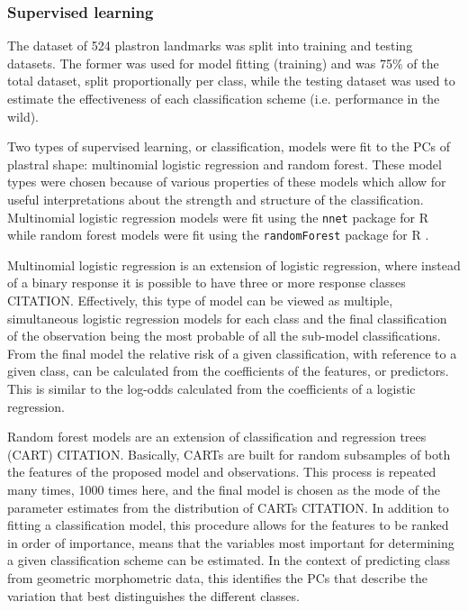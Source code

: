 \documentclass[12pt]{article}\usepackage{graphicx, color}
\begin{document}
\subsubsection{Supervised learning}
The dataset of 524 plastron landmarks was split into training and testing datasets. The former was used for model fitting (training) and was 75\% of the total dataset, split proportionally per class, while the testing dataset was used to estimate the effectiveness of each classification scheme (i.e. performance in the wild).

Two types of supervised learning, or classification, models were fit to the PCs of plastral shape: multinomial logistic regression and random forest. These model types were chosen because of various properties of these models which allow for useful interpretations about the strength and structure of the classification. Multinomial logistic regression models were fit using the \texttt{nnet} package for R \citep{Venables2002} while random forest models were fit using the \texttt{randomForest} package for R \citep{Liaw2002}.

Multinomial logistic regression is an extension of logistic regression, where instead of a binary response it is possible to have three or more response classes CITATION. Effectively, this type of model can be viewed as multiple, simultaneous logistic regression models for each class and the final classification of the observation being the most probable of all the sub-model classifications. From the final model the relative risk of a given classification, with reference to a given class, can be calculated from the coefficients of the features, or predictors. This is similar to the log-odds calculated from the coefficients of a logistic regression.

Random forest models are an extension of classification and regression trees (CART) CITATION. Basically, CARTs are built for random subsamples of both the features of the proposed model and observations. This process is repeated many times, 1000 times here, and the final model is chosen as the mode of the parameter estimates from the distribution of CARTs CITATION. In addition to fitting a classification model, this procedure allows for the features to be ranked in order of importance, means that the variables most important for determining a given classification scheme can be estimated. In the context of predicting class from geometric morphometric data, this identifies the PCs that describe the variation that best distinguishes the different classes.
\end{document}

